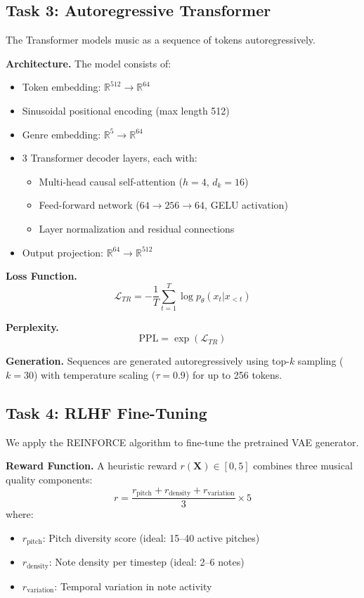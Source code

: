 \documentclass[conference]{IEEEtran}
\begin{document}
\subsection{Task 3: Autoregressive Transformer}

The Transformer models music as a sequence of tokens autoregressively.

\textbf{Architecture.} The model consists of:
\begin{itemize}
    \item Token embedding: $\mathbb{R}^{512} \rightarrow \mathbb{R}^{64}$
    \item Sinusoidal positional encoding (max length 512)
    \item Genre embedding: $\mathbb{R}^{5} \rightarrow \mathbb{R}^{64}$
    \item 3 Transformer decoder layers, each with:
    \begin{itemize}
        \item Multi-head causal self-attention ($h=4$, $d_k=16$)
        \item Feed-forward network ($64 \rightarrow 256 \rightarrow 64$, GELU activation)
        \item Layer normalization and residual connections
    \end{itemize}
    \item Output projection: $\mathbb{R}^{64} \rightarrow \mathbb{R}^{512}$
\end{itemize}

\textbf{Loss Function.}
\begin{equation}
    \mathcal{L}_{TR} = -\frac{1}{T}\sum_{t=1}^{T} \log p_\theta(x_t | x_{<t})
\end{equation}

\textbf{Perplexity.}
\begin{equation}
    \text{PPL} = \exp\left(\mathcal{L}_{TR}\right)
\end{equation}

\textbf{Generation.} Sequences are generated autoregressively using top-$k$ sampling ($k=30$) with temperature scaling ($\tau = 0.9$) for up to 256 tokens.

\subsection{Task 4: RLHF Fine-Tuning}

We apply the REINFORCE algorithm to fine-tune the pretrained VAE generator.

\textbf{Reward Function.} A heuristic reward $r(\mathbf{X}) \in [0, 5]$ combines three musical quality components:
\begin{equation}
    r = \frac{r_{\text{pitch}} + r_{\text{density}} + r_{\text{variation}}}{3} \times 5
\end{equation}
where:
\begin{itemize}
    \item $r_{\text{pitch}}$: Pitch diversity score (ideal: 15--40 active pitches)
    \item $r_{\text{density}}$: Note density per timestep (ideal: 2--6 notes)
    \item $r_{\text{variation}}$: Temporal variation in note activity
\end{itemize}
\end{document}

